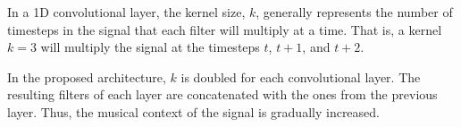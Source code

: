 
In a 1D convolutional layer, the kernel size, $k$, generally
represents the number of timesteps in the signal that each
filter will multiply at a time. That is, a kernel $k=3$ will
multiply the signal at the timesteps $t$, $t+1$, and $t+2$.

In the proposed architecture, $k$ is doubled for each
convolutional layer. The resulting filters of each layer are
concatenated with the ones from the previous layer. Thus,
the musical context of the signal is gradually increased.
